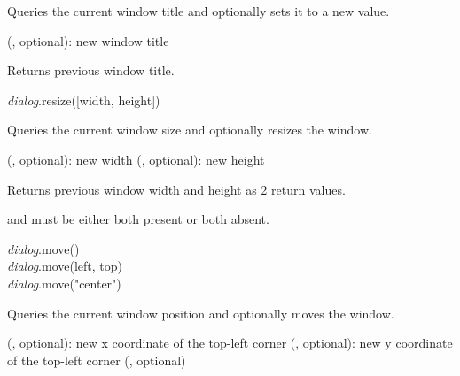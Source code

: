 \documentclass[a4paper,12pt,twoside,extrafontsizes]{memoir}
\begin{document}
\begin{funcdescr}
	Queries the current window title and optionally sets it to a new value.
\end{funcdescr}

\begin{funcparams}
	 (, optional): new window title
\end{funcparams}

\begin{funcret}
	Returns previous window title.
\end{funcret}


\begin{luafuncprototype}
\emph{dialog}.resize([width, height])
\end{luafuncprototype}

\begin{funcdescr}
	Queries the current window size and optionally resizes the window.
\end{funcdescr}

\begin{funcparams}
	 (, optional): new width
	 (, optional): new height
\end{funcparams}

\begin{funcret}
	Returns previous window width and height as 2 return values.
\end{funcret}

\begin{funcremarks}
	 and  must be either both present or both absent.
\end{funcremarks}


\begin{luafuncprototype}
\emph{dialog}.move()\\
\emph{dialog}.move(left, top)\\
\emph{dialog}.move("center")
\end{luafuncprototype}

\begin{funcdescr}
	Queries the current window position and optionally moves the window.
\end{funcdescr}

\begin{funcparams}
	 (, optional): new x coordinate of the top-left corner
	 (, optional): new y coordinate of the top-left corner
	 (, optional)
\end{funcparams}
\end{document}

